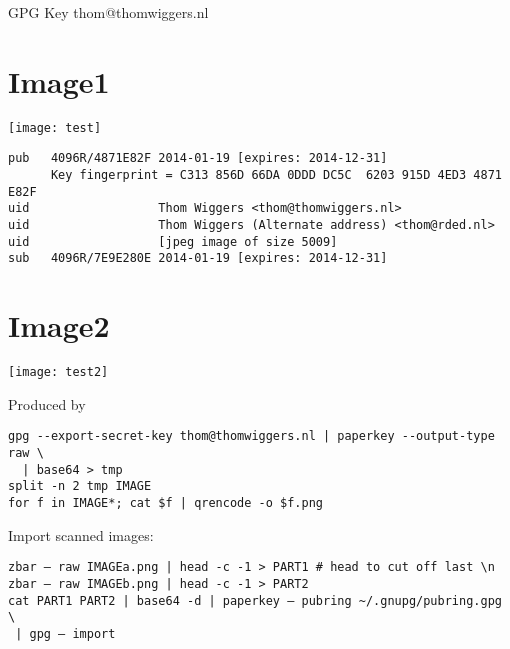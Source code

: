 \documentclass{article}
\begin{document}
\begin{center}
\huge GPG Key thom@thomwiggers.nl
\end{center}

\section{Image1}
\texttt{[image: test]}

\begin{verbatim}
pub   4096R/4871E82F 2014-01-19 [expires: 2014-12-31]
      Key fingerprint = C313 856D 66DA 0DDD DC5C  6203 915D 4ED3 4871 E82F
uid                  Thom Wiggers <thom@thomwiggers.nl>
uid                  Thom Wiggers (Alternate address) <thom@rded.nl>
uid                  [jpeg image of size 5009]
sub   4096R/7E9E280E 2014-01-19 [expires: 2014-12-31]
\end{verbatim}

\section{Image2}
\texttt{[image: test2]}

Produced by 
\begin{verbatim}
gpg --export-secret-key thom@thomwiggers.nl | paperkey --output-type raw \
  | base64 > tmp
split -n 2 tmp IMAGE
for f in IMAGE*; cat $f | qrencode -o $f.png
\end{verbatim}

Import scanned images:
\begin{verbatim}
zbar – raw IMAGEa.png | head -c -1 > PART1 # head to cut off last \n
zbar – raw IMAGEb.png | head -c -1 > PART2
cat PART1 PART2 | base64 -d | paperkey – pubring ~/.gnupg/pubring.gpg \
 | gpg – import
\end{verbatim}
\end{document}

